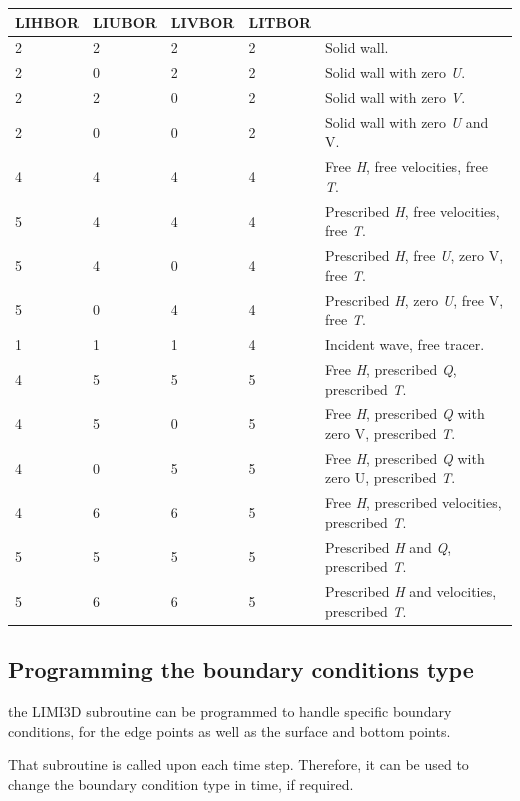 \begin{tabular}{|p{0.5in}|p{0.5in}|p{0.5in}|p{0.5in}|p{2.0in}|} \hline
LIHBOR & LIUBOR & LIVBOR & LITBOR &  \\ \hline
2 & 2 & 2 & 2 & Solid wall. \\ \hline
2 & 0 & 2 & 2 & Solid wall with zero \textit{U}. \\ \hline
2 & 2 & 0 & 2 & Solid wall with zero \textit{V}. \\ \hline
2 & 0 & 0 & 2 & Solid wall with zero \textit{U} and V. \\ \hline
4 & 4 & 4 & 4 & Free \textit{H}, free velocities, free \textit{T}. \\ \hline
5 & 4 & 4 & 4 & Prescribed \textit{H}, free velocities, free \textit{T}. \\ \hline
5 & 4 & 0 & 4 & Prescribed \textit{H}, free \textit{U}, zero V, free
\textit{T}. \\ \hline
5 & 0 & 4 & 4 & Prescribed \textit{H}, zero \textit{U}, free V, free \textit{T}. \\ \hline
1 & 1 & 1 & 4 & Incident wave, free tracer. \\ \hline
4 & 5 & 5 & 5 & Free \textit{H}, prescribed \textit{Q}, prescribed \textit{T}. \\ \hline
4 & 5 & 0 & 5 & Free \textit{H}, prescribed \textit{Q} with zero V, prescribed
\textit{T}. \\ \hline
4 & 0 & 5 & 5 & Free \textit{H},  prescribed \textit{Q} with zero U, prescribed \textit{T}. \\ \hline
4 & 6 & 6 & 5 & Free \textit{H}, prescribed velocities, prescribed \textit{T}.
\\ \hline
5 & 5 & 5 & 5 & Prescribed \textit{H} and \textit{Q}, prescribed \textit{T}. \\ \hline
5 & 6 & 6 & 5 & Prescribed \textit{H} and velocities, prescribed \textit{T}. \\
\hline
\end{tabular}


\subsection{Programming the boundary conditions type}

the LIMI3D subroutine can be programmed to handle specific boundary
conditions, for the edge points as well as the surface and bottom points.

That subroutine is called upon each time step. Therefore, it can be used to
change the boundary condition type in time, if required.


